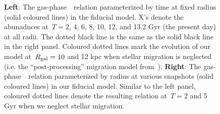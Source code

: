 \documentclass[ms.tex]{subfiles}
\begin{document}
\begin{figure}
\caption{
\textbf{Left}: The gas-phase~\ohno~relation parameterized by time at
fixed radius (solid coloured lines) in the fiducial model. X's denote the
abunadnces at~$T = 2$, 4, 6, 8, 10, 12, and 13.2 Gyr (the present day) at all
radii.
The dotted black line is the same as the solid black line in the right panel.
Coloured dotted lines mark the evolution of our model at~$R_\text{gal} = 10$ and 12
kpc when stellar migration is neglected (i.e. the ``post-processing'' migration
model from~\citealp{Johnson2021}).
\textbf{Right}: The gas-phase~\ohno~relation parameterized by radius at
various snapshots (solid coloured lines) in our fiducial model.
Similar to the left panel, coloured dotted lines denote the resulting relation
at~$T = 2$ and 5 Gyr when we neglect stellar migration.
}
\label{fig:no_oh_timeevol}
\end{figure}
\end{document}
